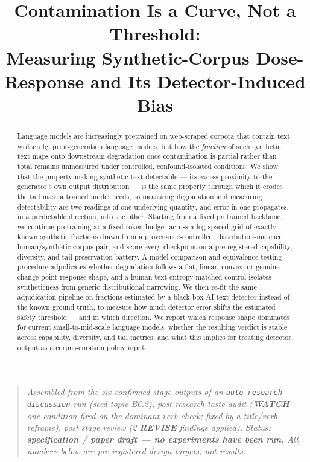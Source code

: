 \documentclass[11pt]{article}
\title{\textbf{Contamination Is a Curve, Not a Threshold:\\ Measuring Synthetic-Corpus Dose-Response and Its Detector-Induced Bias}}
\author{}
\date{}
\begin{document}
\maketitle
\vspace{-2em}

\begin{quote}
\small\textit{Assembled from the six confirmed stage outputs of an \texttt{auto-research-discussion} run (seed topic B6.2), post research-taste audit (\textcolor{Dandelion}{\textbf{WATCH}} --- one condition fired on the dominant-verb check; fixed by a title/verb reframe), post stage review (2 \textbf{REVISE} findings applied). Status: \textbf{specification / paper draft --- no experiments have been run.} All numbers below are pre-registered design targets, not results.}
\end{quote}

\begin{abstract}
Language models are increasingly pretrained on web-scraped corpora that contain text written by prior-generation language models, but how the \emph{fraction} of such synthetic text maps onto downstream degradation once contamination is partial rather than total remains unmeasured under controlled, confound-isolated conditions. We show that the property making synthetic text detectable --- its excess proximity to the generator's own output distribution --- is the same property through which it erodes the tail mass a trained model needs, so measuring degradation and measuring detectability are two readings of one underlying quantity, and error in one propagates, in a predictable direction, into the other. Starting from a fixed pretrained backbone, we continue pretraining at a fixed token budget across a log-spaced grid of exactly-known synthetic fractions drawn from a provenance-controlled, distribution-matched human/synthetic corpus pair, and score every checkpoint on a pre-registered capability, diversity, and tail-preservation battery. A model-comparison-and-equivalence-testing procedure adjudicates whether degradation follows a flat, linear, convex, or genuine change-point response shape, and a human-text entropy-matched control isolates syntheticness from generic distributional narrowing. We then re-fit the same adjudication pipeline on fractions estimated by a black-box AI-text detector instead of the known ground truth, to measure how much detector error shifts the estimated safety threshold --- and in which direction. We report which response shape dominates for current small-to-mid-scale language models, whether the resulting verdict is stable across capability, diversity, and tail metrics, and what this implies for treating detector output as a corpus-curation policy input.
\end{abstract}
\end{document}
